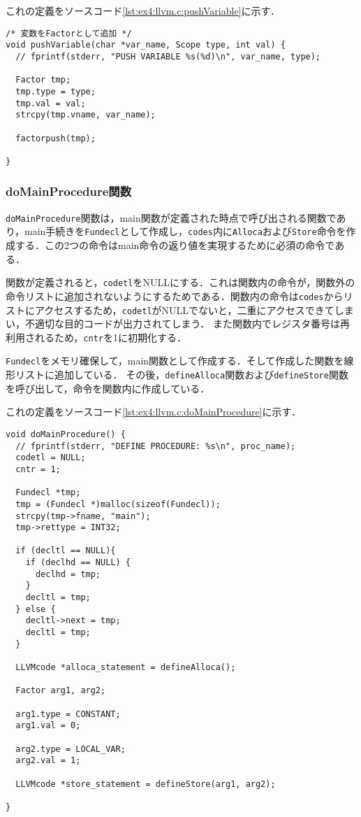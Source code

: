 \documentclass[uplatex]{jsarticle}
\begin{document}
これの定義をソースコード\ref{lst:ex4:llvm.c:pushVariable}に示す．

\begin{lstlisting}[caption=pushVariable関数の定義,label=lst:ex4:llvm.c:pushVariable]
/* 変数をFactorとして追加 */
void pushVariable(char *var_name, Scope type, int val) {
  // fprintf(stderr, "PUSH VARIABLE %s(%d)\n", var_name, type);

  Factor tmp;
  tmp.type = type;
  tmp.val = val;
  strcpy(tmp.vname, var_name);

  factorpush(tmp);

}
\end{lstlisting}

\subsubsection{doMainProcedure関数}
\verb#doMainProcedure#関数は，main関数が定義された時点で呼び出される関数であり，main手続きを\verb#Fundecl#として作成し，\verb#codes#内に\verb#Alloca#および\verb#Store#命令を作成する．この2つの命令はmain命令の返り値を実現するために必須の命令である．

関数が定義されると，\verb#codetl#をNULLにする．これは関数内の命令が，関数外の命令リストに追加されないようにするためである．関数内の命令は\verb#codes#からリストにアクセスするため，\verb#codetl#がNULLでないと，二重にアクセスできてしまい，不適切な目的コードが出力されてしまう．
また関数内でレジスタ番号は再利用されるため，\verb#cntr#を1に初期化する．

\verb#Fundecl#をメモリ確保して，main関数として作成する．そして作成した関数を線形リストに追加している．
その後，\verb#defineAlloca#関数および\verb#defineStore#関数を呼び出して，命令を関数内に作成している．

これの定義をソースコード\ref{lst:ex4:llvm.c:doMainProcedure}に示す．

\begin{lstlisting}[caption=doMainProcedure関数の定義,label=lst:ex4:llvm.c:doMainProcedure]
void doMainProcedure() {
  // fprintf(stderr, "DEFINE PROCEDURE: %s\n", proc_name);
  codetl = NULL;
  cntr = 1;

  Fundecl *tmp;
  tmp = (Fundecl *)malloc(sizeof(Fundecl));
  strcpy(tmp->fname, "main");
  tmp->rettype = INT32;

  if (decltl == NULL){
    if (declhd == NULL) {
      declhd = tmp;
    }
    decltl = tmp;
  } else {
    decltl->next = tmp;
    decltl = tmp;
  }

  LLVMcode *alloca_statement = defineAlloca();

  Factor arg1, arg2;

  arg1.type = CONSTANT;
  arg1.val = 0;

  arg2.type = LOCAL_VAR;
  arg2.val = 1;

  LLVMcode *store_statement = defineStore(arg1, arg2);

}
\end{lstlisting}
\end{document}
